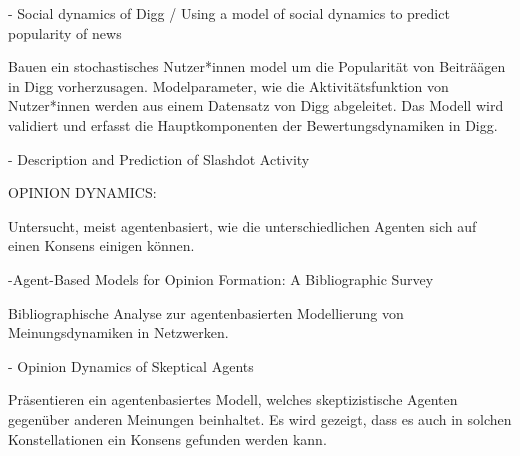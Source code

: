 - Social dynamics of Digg / Using a model of social dynamics to predict popularity of news

Bauen ein stochastisches Nutzer*innen model um die Popularität von Beiträägen in Digg vorherzusagen. Modelparameter, wie die Aktivitätsfunktion von Nutzer*innen werden aus einem Datensatz von Digg abgeleitet. Das Modell wird validiert und erfasst die Hauptkomponenten der Bewertungsdynamiken in Digg.

- Description and Prediction of Slashdot Activity


OPINION DYNAMICS:


Untersucht, meist agentenbasiert, wie die unterschiedlichen Agenten sich auf einen Konsens einigen können.


-Agent-Based Models for Opinion Formation: A Bibliographic Survey

Bibliographische Analyse zur agentenbasierten Modellierung von Meinungsdynamiken in Netzwerken.

- Opinion Dynamics of Skeptical Agents

Präsentieren ein agentenbasiertes Modell, welches skeptizistische Agenten gegenüber anderen Meinungen beinhaltet. Es wird gezeigt, dass es auch in solchen Konstellationen ein Konsens gefunden werden kann.